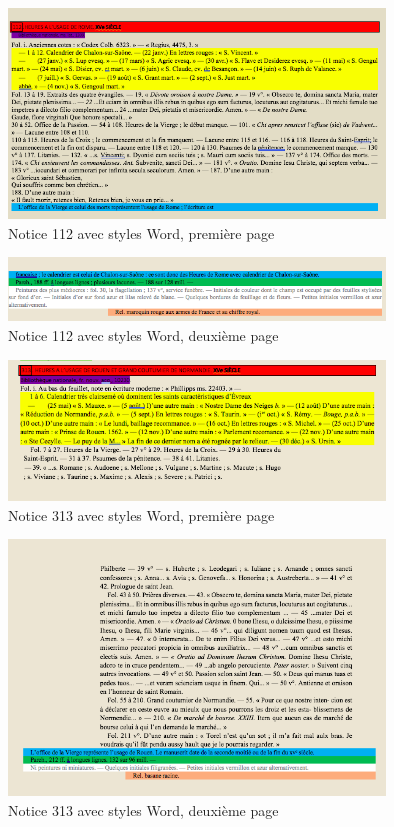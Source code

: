 \documentclass[a4paper,12pt,twoside]{book}
\begin{document}
    \begin{figure}[!h]
    \centering
    \includegraphics[width=10cm]{img/Doc_Sources_transformation/Docs_Word_Styles/Notice112/Notice112_1.png}
    \caption{Notice 112 avec styles Word, première page}
    \end{figure}
    \clearpage
    
    \begin{figure}[!h]
    \centering
    \includegraphics[width=10cm]{img/Doc_Sources_transformation/Docs_Word_Styles/Notice112/Notice112_2.png}
    \caption{Notice 112 avec styles Word, deuxième page}
    \end{figure}
    
    
    \begin{figure}[!h]
    \centering
    \includegraphics[width=10cm]{img/Doc_Sources_transformation/Docs_Word_Styles/Notice313/Notice313_1.png}
    \caption{Notice 313 avec styles Word, première page}
    \end{figure}
    
    \begin{figure}[!h]
    \centering
    \includegraphics[width=10cm]{img/Doc_Sources_transformation/Docs_Word_Styles/Notice313/Notice313_2.png}
    \caption{Notice 313 avec styles Word, deuxième page}
    \end{figure}
    \clearpage
    
\end{document}
